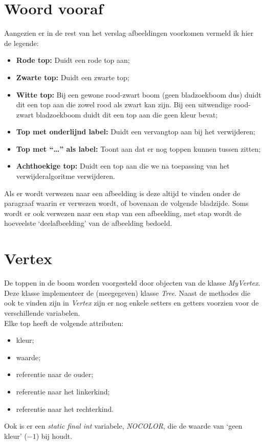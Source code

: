 \documentclass[11pt,a4paper]{report}
\begin{document}
\section*{Woord vooraf}
Aangezien er in de rest van het verslag afbeeldingen voorkomen vermeld ik hier de legende:
\begin{itemize}
\item \textbf{Rode top:} Duidt een rode top aan;
\item \textbf{Zwarte top:} Duidt een zwarte top;
\item \textbf{Witte top:} Bij een gewone rood-zwart boom (geen bladzoekboom dus) duidt dit een top aan die zowel rood als zwart kan zijn. Bij een uitwendige rood-zwart bladzoekboom duidt dit een top aan die geen kleur bevat;
\item \textbf{Top met onderlijnd label:} Duidt een vervangtop aan bij het verwijderen;
\item \textbf{Top met ``\dots'' als label:} Toont aan dat er nog toppen kunnen tussen zitten;
\item \textbf{Achthoekige top:} Duidt een top aan die we na toepassing van het verwijderalgoritme verwijderen.
\end{itemize}
Als er wordt verwezen naar een afbeelding is deze altijd te vinden onder de paragraaf waarin er verwezen wordt, of bovenaan de volgende bladzijde. Soms wordt er ook verwezen naar een stap van een afbeelding, met stap wordt de hoeveelste `deelafbeelding' van de afbeelding bedoeld.

\section{Vertex}
De toppen in de boom worden voorgesteld door objecten van de klasse \textsl{MyVertex}. Deze klasse implementeer de (meegegeven) klasse \textsl{Tree}. Naast de methodes die ook te vinden zijn in \textsl{Vertex} zijn er nog enkele setters en getters voorzien voor de verschillende variabelen.\\
Elke top heeft de volgende attributen:
\begin{itemize}
\item kleur;
\item waarde;
\item referentie naar de ouder;
\item referentie naar het linkerkind;
\item referentie naar het rechterkind.
\end{itemize}
Ook is er een \textsl{static final int} variabele, \textsl{NOCOLOR}, die de waarde van `geen kleur' ($-1$) bij houdt.
\end{document}
